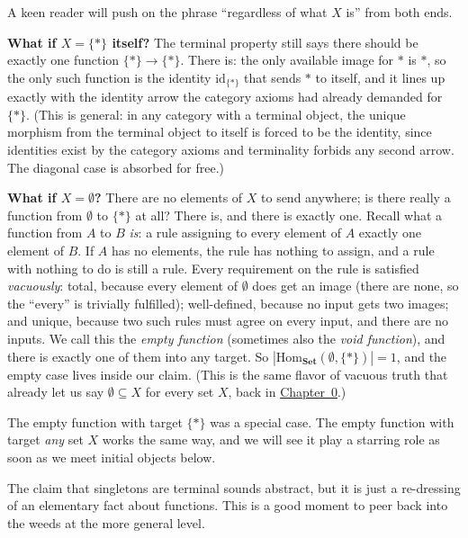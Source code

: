 \begin{remark}[Two corner cases: $X = \{*\}$ and $X = \emptyset$]
A keen reader will push on the phrase ``regardless of what $X$ is'' from
both ends.

\textbf{What if $X = \{*\}$ itself?} The terminal property still says there
should be exactly one function $\{*\} \to \{*\}$. There is: the only
available image for $*$ is $*$, so the only such function is the identity
$\mathrm{id}_{\{*\}}$ that sends $*$ to itself, and it lines up exactly with
the identity arrow the category axioms had already demanded for $\{*\}$.
(This is general: in any category with a terminal object, the unique
morphism from the terminal object to itself is forced to be the identity,
since identities exist by the category axioms and terminality forbids any
second arrow. The diagonal case is absorbed for free.)

\textbf{What if $X = \emptyset$?} There are no elements of $X$ to send
anywhere; is there really a function from $\emptyset$ to $\{*\}$ at all?
There is, and there is exactly one. Recall what a function from $A$ to $B$
\textit{is}: a rule assigning to every element of $A$ exactly one element of
$B$. If $A$ has no elements, the rule has nothing to assign, and a rule with
nothing to do is still a rule. Every requirement on the rule is satisfied
\textit{vacuously}: total, because every element of $\emptyset$ does get an
image (there are none, so the ``every'' is trivially fulfilled); well-defined,
because no input gets two images; and unique, because two such rules must
agree on every input, and there are no inputs. We call this the \textit{empty
function} (sometimes also the \textit{void
function}), and there is exactly
one of them into any target. So $|\mathrm{Hom}_{\mathbf{Set}}(\emptyset,
\{*\})| = 1$, and the empty case lives inside our claim. (This is the same
flavor of vacuous truth that already let us say $\emptyset \subseteq X$ for
every set $X$, back in
\hyperref[para:purple-motorcycle-club]{Chapter~0}.)

The empty function with target $\{*\}$ was a special case. The empty function
with target \textit{any} set $X$ works the same way, and we will see it play
a starring role as soon as we meet initial objects below.
\end{remark}

\noindent The claim that singletons are terminal sounds abstract, but it is just
a re-dressing of an elementary fact about functions. This is a good moment to
peer back into the weeds at the more general level.

